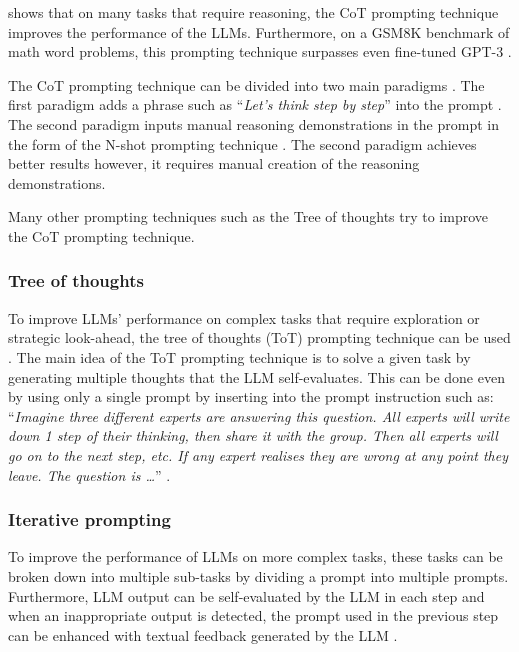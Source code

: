 \citet{Wei2022} shows that on many tasks that require reasoning, the CoT prompting technique improves the performance of the LLMs. Furthermore, on a GSM8K benchmark of math word problems, this prompting technique surpasses even fine-tuned GPT-3 \cite{Wei2022}.

The CoT prompting technique can be divided into two main paradigms \cite{Zhang2022}. The first paradigm adds a phrase such as ``\textit{Let's think step by step}'' into the prompt \cite{Kojima2022}. The second paradigm inputs manual reasoning demonstrations in the prompt in the form of the N-shot prompting technique \cite{Wei2022}. 
The second paradigm achieves better results \cite{Wei2022} however, it requires manual creation of the reasoning demonstrations.

Many other prompting techniques such as the Tree of thoughts try to improve the CoT prompting technique.


\subsubsection{Tree of thoughts}
\label{sec:tree_of_thoughts}

To improve LLMs' performance on complex tasks that require exploration or strategic look-ahead, the tree of thoughts (ToT) prompting technique can be used \cite{Long2023, Yao2024}. The main idea of the ToT prompting technique is to solve a given task by generating multiple thoughts that the LLM self-evaluates. This can be done even by using only a single prompt by inserting into the prompt instruction such as: ``\textit{Imagine three different experts are answering this question. All experts will write down 1 step of their thinking, then share it with the group. Then all experts will go on to the next step, etc. If any expert realises they are wrong at any point they leave. The question is \ldots}'' \cite{Hulbert2023}.


\subsubsection{Iterative prompting}
\label{sec:iterative_prompting}

To improve the performance of LLMs on more complex tasks, these tasks can be broken down into multiple sub-tasks by dividing a prompt into multiple prompts. Furthermore, LLM output can be self-evaluated by the LLM in each step and when an inappropriate output is detected, the prompt used in the previous step can be enhanced with textual feedback generated by the LLM \cite{Shinn2024}.

